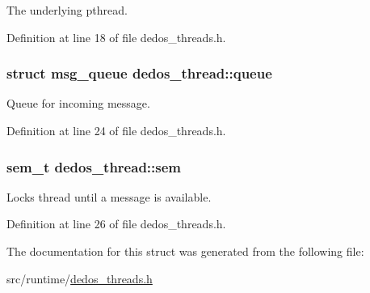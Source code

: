 The underlying pthread. 



Definition at line 18 of file dedos\-\_\-threads.\-h.

\hypertarget{structdedos__thread_ace61dc188bd6d8018126c508b1a42493}{
\subsubsection[{queue}]{\setlength{\rightskip}{0pt plus 5cm}struct {\bf msg\-\_\-queue} dedos\-\_\-thread\-::queue}}\label{structdedos__thread_ace61dc188bd6d8018126c508b1a42493}


Queue for incoming message. 



Definition at line 24 of file dedos\-\_\-threads.\-h.

\hypertarget{structdedos__thread_ababe14eb9fbd46f21932e27b04785973}{
\subsubsection[{sem}]{\setlength{\rightskip}{0pt plus 5cm}sem\-\_\-t dedos\-\_\-thread\-::sem}}\label{structdedos__thread_ababe14eb9fbd46f21932e27b04785973}


Locks thread until a message is available. 



Definition at line 26 of file dedos\-\_\-threads.\-h.



The documentation for this struct was generated from the following file\-:\begin{DoxyCompactItemize}
\item 
src/runtime/\hyperlink{dedos__threads_8h}{dedos\-\_\-threads.\-h}\end{DoxyCompactItemize}
